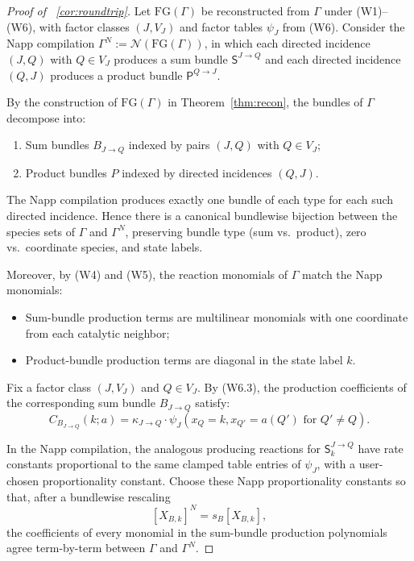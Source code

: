 \documentclass{article}
\theoremstyle{plain}
\theoremstyle{definition}
\theoremstyle{remark}
\newcommand{\<}{\langle}
\renewcommand{\>}{\rangle}
\begin{document}
\begin{proof}[Proof of ~\ref{cor:roundtrip}]
Let $\mathrm{FG}(\Gamma)$ be reconstructed from $\Gamma$ under (W1)--(W6), with factor 
classes $(J, V_J)$ and factor tables $\psi_J$ from (W6). Consider the Napp compilation 
$\Gamma^N := \mathcal{N}(\mathrm{FG}(\Gamma))$, in which each directed incidence 
$(J, Q)$ with $Q \in V_J$ produces a sum bundle $\mathsf{S}^{J \to Q}$ and each 
directed incidence $(Q, J)$ produces a product bundle $\mathsf{P}^{Q \to J}$.

By the construction of $\mathrm{FG}(\Gamma)$ in Theorem~\ref{thm:recon}, 
the bundles of $\Gamma$ decompose into:
\begin{enumerate}
\item Sum bundles $B_{J \to Q}$ indexed by pairs $(J, Q)$ with $Q \in V_J$;
\item Product bundles $P$ indexed by directed incidences $(Q, J)$.
\end{enumerate}

The Napp compilation produces exactly one bundle of each type for each such directed 
incidence. Hence there is a canonical bundlewise bijection between the species sets 
of $\Gamma$ and $\Gamma^N$, preserving bundle type (sum vs.\ product), zero vs.\ 
coordinate species, and state labels.

Moreover, by (W4) and (W5), the reaction monomials of $\Gamma$ match the Napp monomials:
\begin{itemize}
\item Sum-bundle production terms are multilinear monomials with one coordinate 
from each catalytic neighbor;
\item Product-bundle production terms are diagonal in the state label $k$.
\end{itemize}

Fix a factor class $(J, V_J)$ and $Q \in V_J$. By (W6.3), the production coefficients 
of the corresponding sum bundle $B_{J \to Q}$ satisfy:
\[
C_{B_{J \to Q}}(k; a) = \kappa_{J \to Q} \cdot \psi_J(x_Q = k, x_{Q'} = a(Q') \text{ for } Q' \neq Q).
\]

In the Napp compilation, the analogous producing reactions for $\mathsf{S}^{J \to Q}_k$ 
have rate constants proportional to the same clamped table entries of $\psi_J$, with 
a user-chosen proportionality constant. Choose these Napp proportionality constants 
so that, after a bundlewise rescaling
\[
[X_{B,k}]^N = s_B [X_{B,k}],
\]
the coefficients of every monomial in the sum-bundle production polynomials agree 
term-by-term between $\Gamma$ and $\Gamma^N$.


\end{proof}
\end{document}
